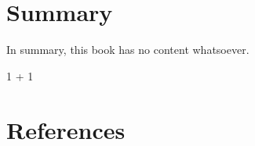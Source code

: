 \documentclass[
  letterpaper,
  DIV=11,
  numbers=noendperiod]{scrreprt}
\newenvironment{Shaded}{\begin{snugshade}}{\end{snugshade}}
\newcommand{\DecValTok}[1]{\textcolor[rgb]{0.68,0.00,0.00}{#1}}
\newcommand{\SpecialCharTok}[1]{\textcolor[rgb]{0.37,0.37,0.37}{#1}}
\newlength{\cslhangindent}
\newenvironment{CSLReferences}[2] %
 {\begin{list}{}{%
  \setlength{\itemindent}{0pt}
  \setlength{\leftmargin}{0pt}
  \setlength{\parsep}{0pt}
  \ifodd #1
   \setlength{\leftmargin}{\cslhangindent}
   \setlength{\itemindent}{-1\cslhangindent}
  \fi
  \setlength{\itemsep}{#2\baselineskip}}}
 {\end{list}}
\begin{document}

\chapter{Summary}\label{summary}

In summary, this book has no content whatsoever.

\begin{Shaded}
\begin{Highlighting}[]
\DecValTok{1} \SpecialCharTok{+} \DecValTok{1}
\end{Highlighting}
\end{Shaded}


\chapter*{References}\label{references}


\label{refs}
\begin{CSLReferences}{0}{1}
\end{CSLReferences}
\end{document}
